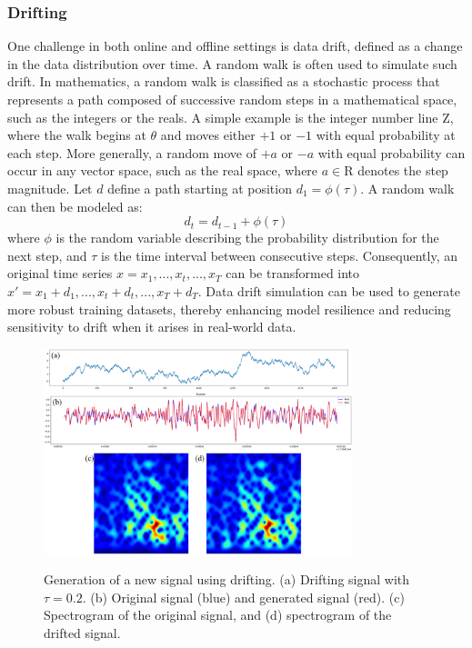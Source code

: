 \documentclass[journal]{IEEEtran}
\begin{document}
\subsubsection{Drifting}
One challenge in both online and offline settings is data drift, defined as a change in the data distribution over time. A random walk is often used to simulate such drift. In mathematics, a random walk is classified as a stochastic process that represents a path composed of successive random steps in a mathematical space, such as the integers or the reals. A simple example is the integer number line $\mathrm{Z}$, where the walk begins at $\theta$ and moves either $+1$ or $-1$ with equal probability at each step. More generally, a random move of $+a$ or $-a$ with equal probability can occur in any vector space, such as the real space, where $a \in \mathrm{R}$ denotes the step magnitude\cite{fields2019mitigating}.
Let $d$ define a path starting at position $d_1=\phi(\tau)$. A random walk can then be modeled as:
\begin{equation}
d_t=d_{t-1}+\phi(\tau)
\end{equation}
where $\phi$ is the random variable describing the probability distribution for the next step, and $\tau$ is the time interval between consecutive steps. Consequently, an original time series $x={x_1,...,x_t,...,x_T}$ can be transformed into $x'={x_1+d_1,...,x_t+d_t,...,x_T+d_T}$.
Data drift simulation can be used to generate more robust training datasets, thereby enhancing model resilience and reducing sensitivity to drift when it arises in real-world data.
\begin{figure}
\centering
{\includegraphics[width=0.8\textwidth,keepaspectratio]{img/da_drifting.png}}
\caption{Generation of a new signal using drifting. (a) Drifting signal with $\tau=0.2$. (b) Original signal (blue) and generated signal (red). (c) Spectrogram of the original signal, and (d) spectrogram of the drifted signal.}
\label{fig:da_drifting}
\end{figure}
\end{document}

